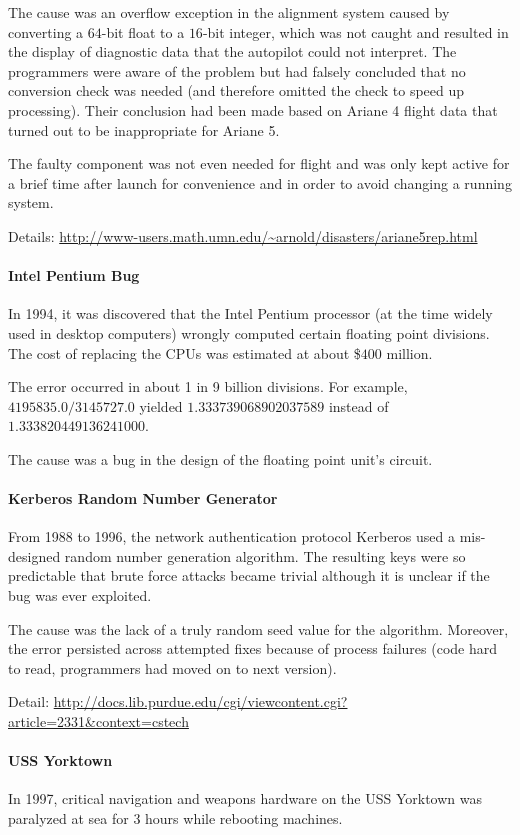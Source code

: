 The cause was an overflow exception in the alignment system caused by converting a $64$-bit float to a $16$-bit integer, which was not caught and resulted in the display of diagnostic data that the autopilot could not interpret.
The programmers were aware of the problem but had falsely concluded that no conversion check was needed (and therefore omitted the check to speed up processing).
Their conclusion had been made based on Ariane 4 flight data that turned out to be inappropriate for Ariane 5.

The faulty component was not even needed for flight and was only kept active for a brief time after launch for convenience and in order to avoid changing a running system.

Details: \url{http://www-users.math.umn.edu/~arnold/disasters/ariane5rep.html}

\paragraph{Intel Pentium Bug}
In 1994, it was discovered that the Intel Pentium processor (at the time widely used in desktop computers) wrongly computed certain floating point divisions.
The cost of replacing the CPUs was estimated at about \$$400$ million.

The error occurred in about 1 in 9 billion divisions.
For example, $4195835.0/3145727.0$ yielded $1.333 739 068 902 037 589$ instead of $1.333 820 449 136 241 000$.

The cause was a bug in the design of the floating point unit's circuit.

\paragraph{Kerberos Random Number Generator}
From 1988 to 1996, the network authentication protocol Kerberos used a mis-designed random number generation algorithm.
The resulting keys were so predictable that brute force attacks became trivial although it is unclear if the bug was ever exploited.

The cause was the lack of a truly random seed value for the algorithm.
Moreover, the error persisted across attempted fixes because of process failures (code hard to read, programmers had moved on to next version).

Detail: \url{http://docs.lib.purdue.edu/cgi/viewcontent.cgi?article=2331&context=cstech}

\paragraph{USS Yorktown}
In 1997, critical navigation and weapons hardware on the USS Yorktown was paralyzed at sea for $3$ hours while rebooting machines.

